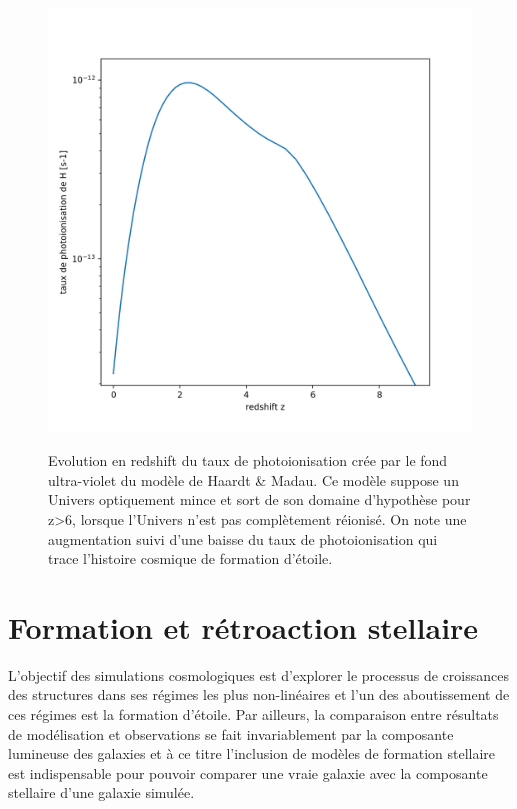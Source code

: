 \begin{figure}[htbp]
	\centering
		\includegraphics[height=12cm]{figs/HM.png}
	\caption[modèle de Haardt \& Madau]{Evolution en redshift du taux de photoionisation crée par le fond ultra-violet du modèle de Haardt \& Madau. Ce modèle suppose un Univers optiquement mince et sort de son domaine d'hypothèse pour z>6, lorsque l'Univers n'est pas complètement réionisé. On note une augmentation suivi d'une baisse du taux de photoionisation qui trace l'histoire cosmique de formation d'étoile.}
	\label{f:HM}
\end{figure}


\section{Formation et rétroaction stellaire}
L'objectif des simulations cosmologiques est d'explorer le processus de croissances des structures dans ses régimes les plus non-linéaires et l'un des aboutissement de ces régimes est la formation d'étoile. Par ailleurs, la comparaison entre résultats de modélisation et observations se fait invariablement par la composante lumineuse des galaxies et à ce titre l'inclusion de modèles de formation stellaire est indispensable pour pouvoir comparer une vraie galaxie avec la composante stellaire d'une galaxie simulée.

